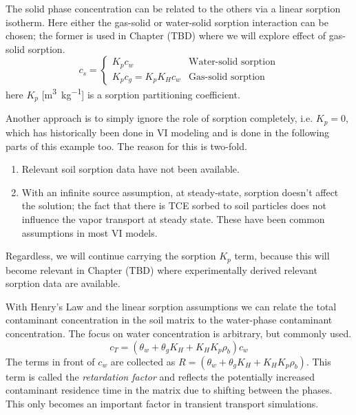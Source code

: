 The solid phase concentration can be related to the others via a linear sorption isotherm.
Here either the gas-solid or water-solid sorption interaction can be chosen; the former is used in Chapter (TBD) where we will explore effect of gas-solid sorption. %
\begin{equation}
  c_s = \begin{cases}
    K_p c_w & \text{Water-solid sorption} \\
    K_p c_g = K_p K_H c_w & \text{Gas-solid sorption}
\end{cases}
\end{equation}
here $K_p$ [\si{\metre\cubed\per\kilogram}] is a sorption partitioning coefficient.\par

Another approach is to simply ignore the role of sorption completely, i.e. $K_p = 0$, which has historically been done in VI modeling and is done in the following parts of this example too.
The reason for this is two-fold.
\begin{enumerate}
  \item Relevant soil sorption data have not been available.
  \item With an infinite source assumption, at steady-state, sorption doesn't affect the solution; the fact that there is TCE sorbed to soil particles does not influence the vapor transport at steady state. These have been common assumptions in most VI models.
\end{enumerate}
Regardless, we will continue carrying the sorption $K_p$ term, because this will become relevant in Chapter (TBD) where experimentally derived relevant sorption data are available.\par %

With Henry's Law and the linear sorption assumptions we can relate the total contaminant concentration in the soil matrix to the water-phase contaminant concentration.
The focus on water concentration is arbitrary, but commonly used.
\begin{equation}
  c_T = (\theta_w + \theta_g K_H + K_H K_p \rho_b) c_w
\end{equation}
The terms in front of $c_w$ are collected as $R = (\theta_w + \theta_g K_H + K_H K_p \rho_b)$.
This term is called the \textit{retardation factor} and reflects the potentially increased contaminant residence time in the matrix due to shifting between the phases.
This only becomes an important factor in transient transport simulations.\par

